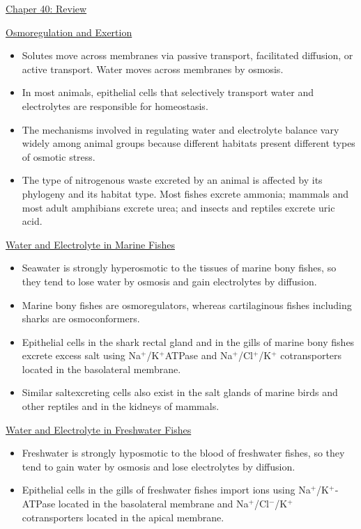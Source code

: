 \documentclass[12pt,letterpaper]{article}
\begin{document}
\hypertarget{40.r}{}
    \begin{probbox}{\hyperlink{40}{Chaper 40: Review}}{
        \hyperlink{40.1}{Osmoregulation and Exertion}
        \begin{itemize}
            \item Solutes move across membranes via passive transport, facilitated diffusion, or active transport. Water moves across membranes by osmosis. 
            \item In most animals, epithelial cells that selectively transport water and electrolytes are responsible for homeostasis. 
            \item The mechanisms involved in regulating water and electrolyte balance vary widely among animal groups because different habitats present different types of osmotic stress.
            \item The type of nitrogenous waste excreted by an animal is affected by its phylogeny and its habitat type. Most fishes excrete ammonia; mammals and most adult amphibians excrete urea; and insects and reptiles excrete uric acid.
        \end{itemize}
        \hyperlink{40.2}{Water and Electrolyte in Marine Fishes}
        \begin{itemize}
            \item Seawater is strongly hyperosmotic to the tissues of marine bony fishes, so they tend to lose water by osmosis and gain electrolytes by diffusion. 
            \item Marine bony fishes are osmoregulators, whereas cartilaginous fishes including sharks are osmoconformers. 
            \item Epithelial cells in the shark rectal gland and in the gills of marine bony fishes excrete excess salt using Na\(^+\)/K\(^+\)­ATPase and Na\(^+\)/Cl\(^+\)/K\(^+\) cotransporters located in the basolateral membrane. 
            \item Similar salt­excreting cells also exist in the salt glands of marine birds and other reptiles and in the kidneys of mammals.
        \end{itemize}
        \hyperlink{40.3}{Water and Electrolyte in Freshwater Fishes}
        \begin{itemize}
            \item Freshwater is strongly hyposmotic to the blood of freshwater fishes, so they tend to gain water by osmosis and lose electrolytes by diffusion. 
            \item Epithelial cells in the gills of freshwater fishes import ions using Na\(^+\)/K\(^+\)­ATPase located in the basolateral membrane and Na\(^+\)/Cl\(^-\)/K\(^+\) cotransporters located in the apical membrane.

\end{itemize}}
\end{probbox}
\end{document}
